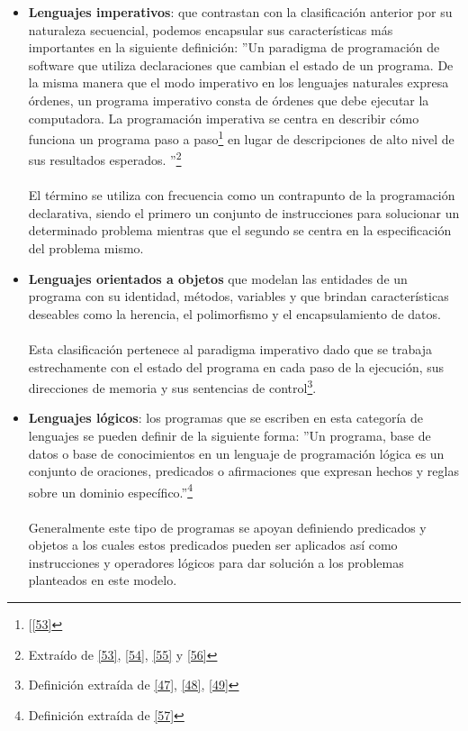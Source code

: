 \begin{itemize}
        \item  \textbf{Lenguajes imperativos}: que contrastan con la clasificación anterior por su naturaleza secuencial, podemos encapsular sus características más importantes en la siguiente definición: 
         ''Un paradigma de programación de software que utiliza declaraciones que cambian el estado de un programa. De la misma manera que el modo imperativo en los lenguajes naturales expresa órdenes, un programa imperativo consta de órdenes que debe ejecutar la computadora. La programación imperativa se centra en describir cómo funciona un programa paso a paso\footnote{[\hyperlink{53}{[53]}} en lugar de descripciones de alto nivel de sus resultados esperados. ''\footnote{Extraído de \hyperlink{53}{[53]}, \hyperlink{54}{[54]}, \hyperlink{55}{[55]} y \hyperlink{56}{[56]}}\\\\
        El término se utiliza con frecuencia como un contrapunto de la programación declarativa, siendo el primero un conjunto de instrucciones para solucionar un determinado problema mientras que el segundo se centra en la especificación del problema mismo.\\

        \item \textbf{Lenguajes orientados a objetos} que modelan las entidades de un programa con su identidad, métodos, variables y que brindan características deseables como la herencia, el polimorfismo y el encapsulamiento de datos.\\\\
        Esta clasificación pertenece al paradigma imperativo dado que se trabaja estrechamente con el estado del programa en cada paso de la ejecución, sus direcciones de memoria y sus sentencias de control\footnote{Definición extraída de \hyperlink{47}{[47]}, \hyperlink{48}{[48]}, \hyperlink{49}{[49]}}.\\
    
        \item \textbf{Lenguajes lógicos}: los programas que se escriben en esta categoría de lenguajes se pueden definir de la siguiente forma:  ''Un programa, base de datos o base de conocimientos en un lenguaje de programación lógica es un conjunto de oraciones, predicados o afirmaciones que expresan hechos y reglas sobre un dominio específico.''\footnote{Definición extraída de \hyperlink{57}{[57]}} \\\\
        Generalmente este tipo de programas se apoyan definiendo predicados y objetos a los cuales estos predicados pueden ser aplicados así como instrucciones y operadores lógicos para dar solución a los problemas planteados en este modelo.

    
    \end{itemize}


